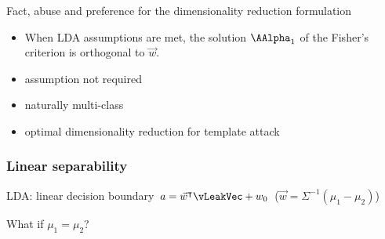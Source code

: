 \begin{frame}
\begin{block}{Fact, abuse and preference for the dimensionality reduction formulation}
\begin{itemize}
\item When LDA assumptions are met, the solution $\AAlpha_1$ of the Fisher's criterion is orthogonal to $\vec{w}$. 
\item assumption not required
\item naturally multi-class
\item optimal dimensionality reduction for template attack
\end{itemize}
\end{block}

\end{frame}

\begin{frame}
\frametitle{Linear separability}

LDA: linear decision boundary $a = \vec{w}^\intercal \vLeakVec + w_0$ ($\vec{w} = \Sigma^{-1}(\mu_1-\mu_2)$)
%
\begin{block}{}
\begin{huge}
\centering What if $\mu_1 = \mu_2$? 
\end{huge}
\end{block}




\end{frame}


